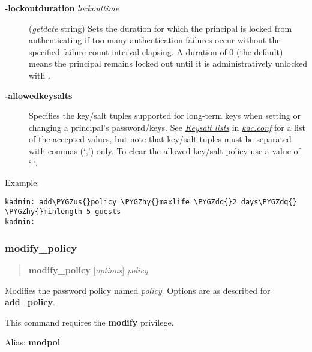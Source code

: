 \documentclass[letterpaper,10pt,english]{sphinxmanual}
\def\PYGZus{\char`\_}
\def\PYGZhy{\char`\-}
\def\PYGZdq{\char`\"}
\begin{document}
\label{admin/admin_commands/kadmin_local:policy-lockoutduration}\begin{description}
\item[{\textbf{-lockoutduration} \emph{lockouttime}}] \leavevmode
(\emph{getdate} string) Sets the duration for which the principal
is locked from authenticating if too many authentication failures
occur without the specified failure count interval elapsing.
A duration of 0 (the default) means the principal remains locked
out until it is administratively unlocked with .

\item[{\textbf{-allowedkeysalts}}] \leavevmode
Specifies the key/salt tuples supported for long-term keys when
setting or changing a principal's password/keys.  See
{\hyperref[admin/conf_files/kdc_conf:keysalt-lists]{\emph{Keysalt lists}}} in {\hyperref[admin/conf_files/kdc_conf:kdc-conf-5]{\emph{kdc.conf}}} for a list of the
accepted values, but note that key/salt tuples must be separated
with commas (`,') only.  To clear the allowed key/salt policy use
a value of `-`.

\end{description}

Example:

\begin{Verbatim}[commandchars=\\\{\}]
kadmin: add\PYGZus{}policy \PYGZhy{}maxlife \PYGZdq{}2 days\PYGZdq{} \PYGZhy{}minlength 5 guests
kadmin:
\end{Verbatim}
\label{admin/admin_commands/kadmin_local:add-policy-end}

\subsubsection{modify\_policy}
\label{admin/admin_commands/kadmin_local:id13}\label{admin/admin_commands/kadmin_local:modify-policy}\label{admin/admin_commands/kadmin_local:add-policy-end}\begin{quote}

\textbf{modify\_policy} {[}\emph{options}{]} \emph{policy}
\end{quote}

Modifies the password policy named \emph{policy}.  Options are as described
for \textbf{add\_policy}.

This command requires the \textbf{modify} privilege.

Alias: \textbf{modpol}
\label{admin/admin_commands/kadmin_local:modify-policy-end}
\end{document}
